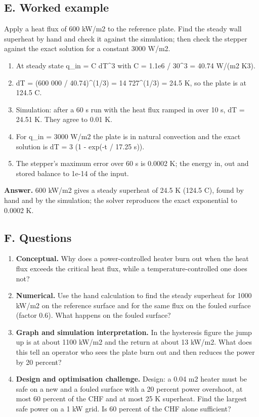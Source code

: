 \documentclass[11pt,a4paper]{article}
\begin{document}
\subsection*{E. Worked example}
Apply a heat flux of 600 kW/m2 to the reference plate. Find the steady wall superheat by hand and check it against the simulation; then check the stepper against the exact solution for a constant 3000 W/m2.
\begin{enumerate}[nosep]
\item At steady state q\_in = C dT\textasciicircum{}3 with C = 1.1e6 / 30\textasciicircum{}3 = 40.74 W/(m2 K3).
\item dT = (600 000 / 40.74)\textasciicircum{}(1/3) = 14 727\textasciicircum{}(1/3) = 24.5 K, so the plate is at 124.5 C.
\item Simulation: after a 60 s run with the heat flux ramped in over 10 s, dT = 24.51 K. They agree to 0.01 K.
\item For q\_in = 3000 W/m2 the plate is in natural convection and the exact solution is dT = 3 (1 - exp(-t / 17.25 s)).
\item The stepper's maximum error over 60 s is 0.0002 K; the energy in, out and stored balance to 1e-14 of the input.
\end{enumerate}
\textbf{Answer.} 600 kW/m2 gives a steady superheat of 24.5 K (124.5 C), found by hand and by the simulation; the solver reproduces the exact exponential to 0.0002 K.

\subsection*{F. Questions}
\begin{enumerate}[nosep]
\item \textbf{Conceptual.} Why does a power-controlled heater burn out when the heat flux exceeds the critical heat flux, while a temperature-controlled one does not?
\item \textbf{Numerical.} Use the hand calculation to find the steady superheat for 1000 kW/m2 on the reference surface and for the same flux on the fouled surface (factor 0.6). What happens on the fouled surface?
\item \textbf{Graph and simulation interpretation.} In the hysteresis figure the jump up is at about 1100 kW/m2 and the return at about 13 kW/m2. What does this tell an operator who sees the plate burn out and then reduces the power by 20 percent?
\item \textbf{Design and optimisation challenge.} Design: a 0.04 m2 heater must be safe on a new and a fouled surface with a 20 percent power overshoot, at most 60 percent of the CHF and at most 25 K superheat. Find the largest safe power on a 1 kW grid. Is 60 percent of the CHF alone sufficient?
\end{enumerate}
\end{document}
